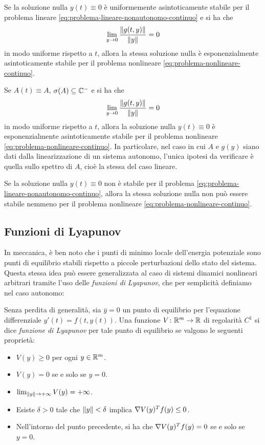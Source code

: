 \begin{teor}
Se la soluzione nulla $y(t) \equiv 0$ è uniformemente asintoticamente
stabile per il problema lineare \eqref{eq:problema-lineare-nonautonomo-continuo}
e si ha che
\[
\lim_{y \to 0} \frac{\left\lVert g(t,y)\right\rVert}{\left\lVert y\right\rVert} = 0
\]
in modo uniforme rispetto a $t$, allora la stessa soluzione nulla
è esponenzialmente asintoticamente stabile per il problema nonlineare
\eqref{eq:problema-nonlineare-continuo}.
\end{teor}

\begin{teor}[Perron] \label{teor:teorema-di-perron-continuo}
Se $A(t) \equiv A$, $\sigma(A) \subseteq \mathbb{C}^-$ e si ha che
\[
\lim_{y \to 0} \frac{\left\lVert g(t,y)\right\rVert}{\left\lVert y\right\rVert} = 0
\]
in modo uniforme rispetto a $t$, allora la soluzione nulla $y(t) \equiv 0$
è esponenzialmente asintoticamente stabile per il problema nonlineare
\eqref{eq:problema-nonlineare-continuo}. In particolare, nel caso in cui
$A$ e $g(y)$ siano dati dalla linearizzazione di un sistema autonomo,
l'unica ipotesi da verificare è quella sullo spettro di $A$,
cioè la stessa del caso lineare.
\end{teor}

\begin{teor} \label{teor:linearizzazione-instabilità}
Se la soluzione nulla $y(t) \equiv 0$ non è stabile per il problema
\eqref{eq:problema-lineare-nonautonomo-continuo}, allora la stessa soluzione
nulla non può essere stabile nemmeno per il problema nonlineare
\eqref{eq:problema-nonlineare-continuo}.
\end{teor}

\subsection*{Funzioni di Lyapunov}

In meccanica, è ben noto che i punti di minimo locale dell'energia
potenziale sono punti di equilibrio stabili rispetto a piccole
perturbazioni dello stato del sistema. Questa stessa idea
può essere generalizzata al caso di sistemi dinamici nonlineari arbitrari
tramite l'uso delle \emph{funzioni di Lyapunov}, che per semplicità definiamo
nel caso autonomo:

\begin{defi}
Senza perdita di generalità, sia $\bar{y} = 0$ un punto di equilibrio
per l'equazione differenziale $y'(t) = f(t,y(t))$. Una funzione
$V \colon \mathbb{R}^m \to \mathbb{R}$ di regolarità $C^1$ si dice \emph{funzione di Lyapunov}
per tale punto di equilibrio se valgono le seguenti proprietà:
\begin{itemize}
\item $V(y) \geq 0$ per ogni $y \in \mathbb{R}^m$.
\item $V(y) = 0$ se e solo se $y = 0$.
\item $\lim_{\left\lVert y\right\rVert \to +\infty} V(y) = +\infty$.
\item Esiste $\delta > 0$ tale che $\left\lVert y\right\rVert < \delta$ implica $\nabla V(y)^T f(y) \leq 0$.
\item Nell'intorno del punto precedente, si ha che $\nabla V(y)^T f(y) = 0$
	se e solo se $y = 0$.
\end{itemize}
\end{defi}

